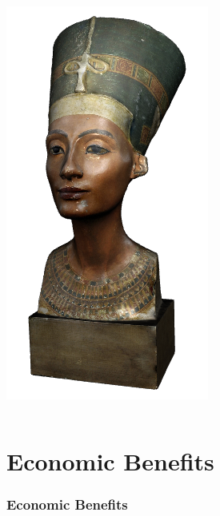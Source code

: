 \begin{frame}
\begin{columns}
\begin{column}{0.2\textwidth}
      \includegraphics[width=.9\textwidth]{images/nefertiti}
    \end{column}
  \end{columns}
\end{frame}

\section{Economic Benefits}

\begin{frame}
  \frametitle{Economic Benefits}
\end{frame}

